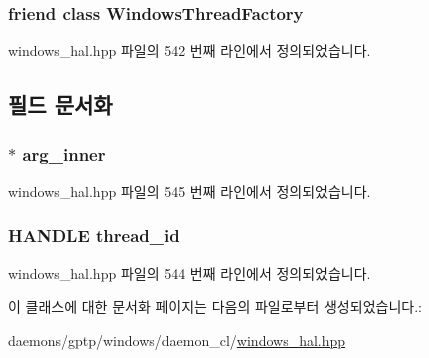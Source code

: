 \subsubsection[{\texorpdfstring{Windows\+Thread\+Factory}{WindowsThreadFactory}}]{\setlength{\rightskip}{0pt plus 5cm}friend class {\bf Windows\+Thread\+Factory}\hspace{0.3cm}{\ttfamily [friend]}}\hypertarget{class_windows_thread_a14530d1b9ed4e46f4c8ca47ac96e941c}{}\label{class_windows_thread_a14530d1b9ed4e46f4c8ca47ac96e941c}


windows\+\_\+hal.\+hpp 파일의 542 번째 라인에서 정의되었습니다.



\subsection{필드 문서화}
\subsubsection[{\texorpdfstring{arg\+\_\+inner}{arg_inner}}]{$\ast$ arg\+\_\+inner\hspace{0.3cm}{\ttfamily [private]}}\hypertarget{class_windows_thread_af6992b2f52fbe4a2362f1f0a81371185}{}\label{class_windows_thread_af6992b2f52fbe4a2362f1f0a81371185}


windows\+\_\+hal.\+hpp 파일의 545 번째 라인에서 정의되었습니다.

\subsubsection[{\texorpdfstring{thread\+\_\+id}{thread_id}}]{\setlength{\rightskip}{0pt plus 5cm}H\+A\+N\+D\+LE thread\+\_\+id\hspace{0.3cm}{\ttfamily [private]}}\hypertarget{class_windows_thread_a9771b03f8c67546b28d7aaad3b8e53ee}{}\label{class_windows_thread_a9771b03f8c67546b28d7aaad3b8e53ee}


windows\+\_\+hal.\+hpp 파일의 544 번째 라인에서 정의되었습니다.



이 클래스에 대한 문서화 페이지는 다음의 파일로부터 생성되었습니다.\+:\begin{DoxyCompactItemize}
\item 
daemons/gptp/windows/daemon\+\_\+cl/\hyperlink{windows__hal_8hpp}{windows\+\_\+hal.\+hpp}\end{DoxyCompactItemize}

